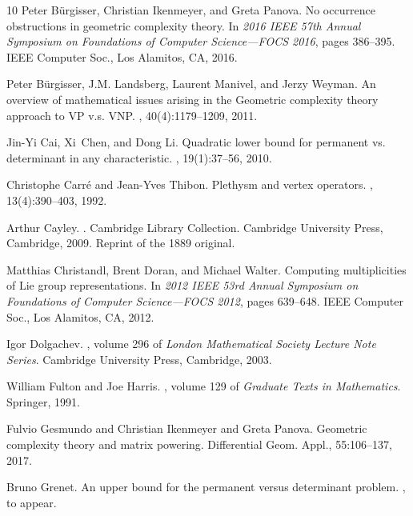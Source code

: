 \documentclass[11pt]{amsart}
\numberwithin{equation}{section}
\begin{document}
\begin{thebibliography}{10}
Peter B{\"u}rgisser, Christian Ikenmeyer, and Greta Panova.
\newblock No occurrence obstructions in geometric complexity theory.
\newblock In {\em 2016 {IEEE} 57th {A}nnual {S}ymposium on {F}oundations of {C}omputer {S}cience---{FOCS} 2016},
pages 386--395. IEEE Computer Soc., Los Alamitos, CA, 2016.

Peter B\"urgisser, J.M. Landsberg, Laurent Manivel, and Jerzy Weyman.
\newblock An overview of mathematical issues arising in the Geometric
  complexity theory approach to {VP} v.s. {VNP}.
, 40(4):1179--1209, 2011.

Jin-Yi Cai, Xi~Chen, and Dong Li.
\newblock Quadratic lower bound for permanent vs. determinant in any
  characteristic.
, 19(1):37--56, 2010.

Christophe Carr{\'e} and Jean-Yves Thibon.
\newblock Plethysm and vertex operators.
, 13(4):390--403, 1992.

Arthur Cayley.
.
\newblock Cambridge Library Collection. Cambridge University Press, Cambridge,
  2009.
\newblock Reprint of the 1889 original.

Matthias Christandl, Brent Doran, and Michael Walter.
\newblock Computing multiplicities of {L}ie group representations.
\newblock In {\em 2012 {IEEE} 53rd {A}nnual {S}ymposium on {F}oundations of
  {C}omputer {S}cience---{FOCS} 2012}, pages 639--648. IEEE Computer Soc., Los
  Alamitos, CA, 2012.

Igor Dolgachev.
, volume 296 of {\em London
  Mathematical Society Lecture Note Series}.
\newblock Cambridge University Press, Cambridge, 2003.

William Fulton and Joe Harris.
, volume 129 of {\em
  Graduate Texts in Mathematics}.
\newblock Springer, 1991.

Fulvio Gesmundo and Christian Ikenmeyer and Greta Panova.
\newblock Geometric complexity theory and matrix powering.
\newblock Differential Geom. Appl., 55:106--137, 2017.

Bruno Grenet.
\newblock An upper bound for the permanent versus determinant problem.
, to appear.


\end{thebibliography}
\end{document}
